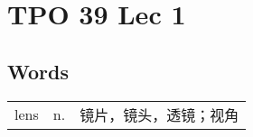\section{TPO 39 Lec 1}

\subsection{Words}

\begin{tabular}{lll}
    lens & n. & 镜片，镜头，透镜；视角 \\
\end{tabular}
